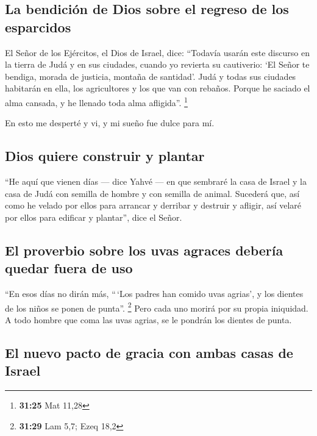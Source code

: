 \begin{paracol}{2}
\hypertarget{la-bendiciuxf3n-de-dios-sobre-el-regreso-de-los-esparcidos}{%
\subsection{La bendición de Dios sobre el regreso de los
esparcidos}\label{la-bendiciuxf3n-de-dios-sobre-el-regreso-de-los-esparcidos}}

 El Señor de los Ejércitos, el Dios de Israel, dice:
``Todavía usarán este discurso en la tierra de Judá y en sus ciudades,
cuando yo revierta su cautiverio: `El Señor te bendiga, morada de
justicia, montaña de santidad'.  Judá y todas sus
ciudades habitarán en ella, los agricultores y los que van con rebaños.
 Porque he saciado el alma cansada, y he llenado toda
alma afligida''. \footnote{\textbf{31:25} Mat 11,28}

 En esto me desperté y vi, y mi sueño fue dulce para mí.

\hypertarget{dios-quiere-construir-y-plantar}{%
\subsection{Dios quiere construir y
plantar}\label{dios-quiere-construir-y-plantar}}

 ``He aquí que vienen días --- dice Yahvé --- en que
sembraré la casa de Israel y la casa de Judá con semilla de hombre y con
semilla de animal.  Sucederá que, así como he velado por
ellos para arrancar y derribar y destruir y afligir, así velaré por
ellos para edificar y plantar'', dice el Señor.

\hypertarget{el-proverbio-sobre-los-uvas-agraces-deberuxeda-quedar-fuera-de-uso}{%
\subsection{El proverbio sobre los uvas agraces debería quedar fuera de
uso}\label{el-proverbio-sobre-los-uvas-agraces-deberuxeda-quedar-fuera-de-uso}}

 ``En esos días no dirán más, ``\,`Los padres han comido
uvas agrias', y los dientes de los niños se ponen de punta''.
\footnote{\textbf{31:29} Lam 5,7; Ezeq 18,2}  Pero cada
uno morirá por su propia iniquidad. A todo hombre que coma las uvas
agrias, se le pondrán los dientes de punta.

\hypertarget{el-nuevo-pacto-de-gracia-con-ambas-casas-de-israel}{%
\subsection{El nuevo pacto de gracia con ambas casas de
Israel}\label{el-nuevo-pacto-de-gracia-con-ambas-casas-de-israel}}


\end{paracol}
